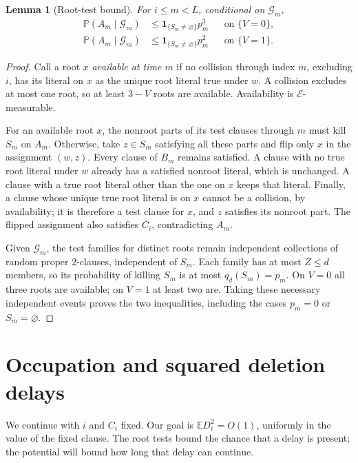 \documentclass[11pt]{article}
\newtheorem{lemma}[theorem]{Lemma}
\theoremstyle{remark}
\newcommand{\Prb}{\mathbb P}
\newcommand{\E}{\mathbb E}
\newcommand{\ind}{\mathbf 1}
\newcommand{\cE}{\mathcal E}
\newcommand{\cG}{\mathcal G}
\numberwithin{equation}{section}
\begin{document}
\begin{lemma}[Root-test bound]
\label{lem:tests}
For $i\le m<L$, conditional on $\cG_m$,
\begin{align}
 \Prb(A_m\mid\cG_m)&\le\ind_{\{S_m\ne\varnothing\}}p_m^3
                         &&\text{on }\{V=0\},\label{eq:test3}\\
 \Prb(A_m\mid\cG_m)&\le\ind_{\{S_m\ne\varnothing\}}p_m^2
                         &&\text{on }\{V=1\}.
 \label{eq:test2}
\end{align}
\end{lemma}

\begin{proof}
Call a root $x$ \emph{available at time $m$} if no collision through
index $m$, excluding $i$, has its literal on $x$ as the unique root
literal true under $w$. A collision excludes at most one root, so at
least $3-V$ roots are available. Availability is $\cE$-measurable.

For an available root $x$, the nonroot parts of its test clauses through
$m$ must kill $S_m$ on $A_m$. Otherwise, take $z\in S_m$ satisfying
all these parts and flip only $x$ in the assignment $(w,z)$.
Every clause of $B_m$ remains satisfied. A clause with no true root
literal under $w$ already has a satisfied nonroot literal, which is
unchanged. A clause with a true root literal other than the one on $x$
keeps that literal. Finally, a clause whose unique true root literal
is on $x$ cannot be a collision, by availability; it is therefore a
test clause for $x$, and $z$ satisfies its nonroot part.
The flipped assignment also satisfies $C_i$, contradicting $A_m$.

Given $\cG_m$, the test families for distinct roots remain independent
collections of random proper 2-clauses, independent of $S_m$.
Each family has at most $Z\le d$ members, so its probability of killing
$S_m$ is at most $q_d(S_m)=p_m$. On $V=0$ all three roots are available;
on $V=1$ at least two are. Taking these necessary independent events
proves the two inequalities, including the cases $p_m=0$ or
$S_m=\varnothing$.
\end{proof}

\section{Occupation and squared deletion delays}
\label{sec:occupation}

We continue with $i$ and $C_i$ fixed. Our goal is $\E D_i^2=O(1)$,
uniformly in the value of the fixed clause. The root tests bound the
chance that a delay is present; the potential will bound how long
that delay can continue.
\end{document}
